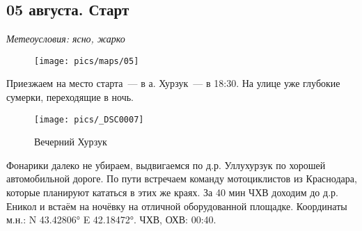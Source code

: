 \subsection{05 августа. Старт}
\textit{Метеоусловия: ясно, жарко}

\begin{figure}[h!]
	\centering
	\texttt{[image: pics/maps/05]}
	\label{fig:05}
\end{figure}

Приезжаем на место старта~--- в а. Хурзук~--- в 18:30. На улице уже глубокие сумерки, переходящие в ночь.

\begin{figure}[h!]
	\centering
	\texttt{[image: pics/\_DSC0007]}
	\caption{Вечерний Хурзук}
	\label{fig:_DSC0007}
\end{figure}

Фонарики далеко не убираем, выдвигаемся по д.р. Уллухурзук по хорошей автомобильной дороге. По пути встречаем команду мотоциклистов из Краснодара, которые планируют кататься в этих же краях. За 40 мин ЧХВ доходим до д.р. Еникол и встаём на ночёвку на отличной оборудованной площадке. Координаты м.н.: N 43.42806° E 42.18472°. ЧХВ, ОХВ: 00:40.

\clearpage